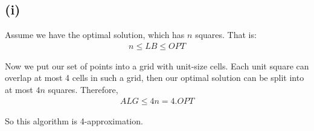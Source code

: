 \subsection*{(i)}
\label{approx-1-3-i}
\newtheorem{lem}[]{Lemma}

Assume we have the optimal solution, which has $n$ squares. That is:
\begin{align*}
    n \le LB \le OPT
\end{align*}

Now we put our set of points into a grid with unit-size cells. Each unit square can overlap at most 4 cells in such a grid, then our optimal solution can be split into at most $4n$ squares. Therefore,
\begin{align*}
  ALG \leq 4n = 4.OPT
\end{align*}

So this algorithm is 4-approximation.
